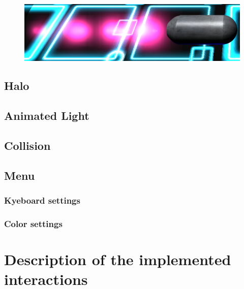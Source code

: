 \documentclass[11pt]{article}
\begin{document}
\begin{figure}
\begin{minipage}[b]{0.276\linewidth}
			\caption{}
			\label{fig:toro}
		\end{minipage}
		\begin{minipage}[b]{0.6\linewidth}
			\includegraphics[width=\linewidth]{motor}
			\caption{}
			\label{fig:motor}
		\end{minipage}
	\end{figure}





\subsection{Halo}
\subsection{Animated Light}
\subsection{Collision}
\subsection{Menu}
\subsubsection{Kyeboard settings}
\subsubsection{Color settings}


\section{Description of the implemented interactions}
\end{document}
